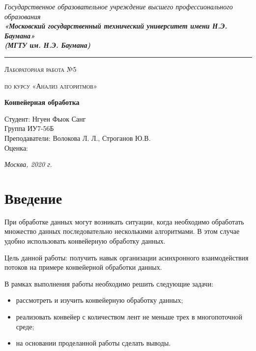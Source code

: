 \documentclass[12pt, a4paper]{report}
\begin{document}
    \begin{titlepage}
    	
    	\begin{center}
    		\Large
    		{\sl Государственное образовательное учреждение высшего профессионального образования\\
    			{\bf«Московский государственный технический университет имени Н.Э. Баумана»\\
    				(МГТУ им. Н.Э. Баумана)}}
    		\noindent\rule{\textwidth}{2pt}
    		\vspace{3cm}
    		
    		{\scshape\LARGE Лабораторная работа №5 \par}
    		\vspace{0.5cm}	
    		{\scshape\LARGE по курсу «Анализ алгоритмов» \par}
    		\vspace{1.5cm}
    		{\huge\bfseries Конвейерная обработка \par}
    		\vspace{2cm}
    		\begin{flushleft}
    			\Large Студент: Нгуен Фыок Санг\\
    			\Large Группа ИУ7-56Б\\
    			Преподаватели:  Волокова Л. Л., Строганов Ю.В.\\
    			Оценка:
    		\end{flushleft}
    		
    		\vfill
    		\Large \textit {Москва, 2020 г.}
    		
    	\end{center}
    	
    \end{titlepage}
	
	\tableofcontents

	\chapter*{Введение}
	\hspace{0.5cm}При обработке данных могут возникать ситуации, когда необходимо обработать множество данных последовательно несколькими алгоритмами. В этом случае удобно использовать конвейерную обработку данных.
	
	Цель данной работы: получить навык организации асинхронного взаимодействия потоков на примере конвейерной обработки данных.
	
	В рамках выполнения работы необходимо решить следующие задачи:   
	\begin{itemize}
		\item рассмотреть и изучить конвейерную обработку данных;
		\item реализовать конвейер с количеством лент не меньше трех в многопоточной среде;
		\item на основании проделанной работы сделать выводы.
	\end{itemize}
\end{document}
